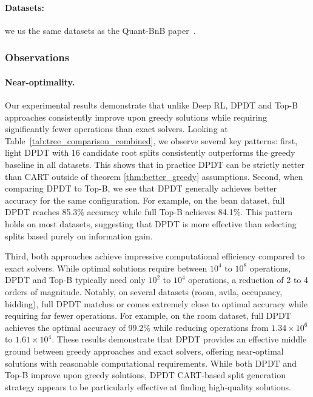 \paragraph{Datasets:} we us the same datasets as the Quant-BnB paper~\cite{quantbnb}.

\subsubsection{Observations}

\paragraph{Near-optimality.} Our experimental results demonstrate that unlike Deep RL, DPDT and Top-B approaches consistently improve upon greedy solutions while requiring significantly fewer operations than exact solvers. Looking at Table~\ref{tab:tree_comparison_combined}, we observe several key patterns:
first, light DPDT with 16 candidate root splits consistently outperforms the greedy baseline in all datasets. This shows that in practice DPDT can be strictly netter than CART outside of theorem \ref{thm:better_greedy} assumptions. 
Second, when comparing DPDT to Top-B, we see that DPDT generally achieves better accuracy for the same configuration. For example, on the bean dataset, full DPDT reaches 85.3\% accuracy while full Top-B achieves 84.1\%. This pattern holds on most datasets, suggesting that DPDT is more effective than selecting splits based purely on information gain.


Third, both approaches achieve impressive computational efficiency compared to exact solvers. While optimal solutions require between $10^4$ to $10^8$ operations, DPDT and Top-B typically need only $10^2$ to $10^4$ operations, a reduction of 2 to 4 orders of magnitude.
Notably, on several datasets (room, avila, occupancy, bidding), full DPDT matches or comes extremely close to optimal accuracy while requiring far fewer operations. For example, on the room dataset, full DPDT achieves the optimal accuracy of 99.2\% while reducing operations from $1.34\times10^6$ to $1.61\times10^4$.
These results demonstrate that DPDT provides an effective middle ground between greedy approaches and exact solvers, offering near-optimal solutions with reasonable computational requirements. While both DPDT and Top-B improve upon greedy solutions, DPDT CART-based split generation strategy appears to be particularly effective at finding high-quality solutions.

